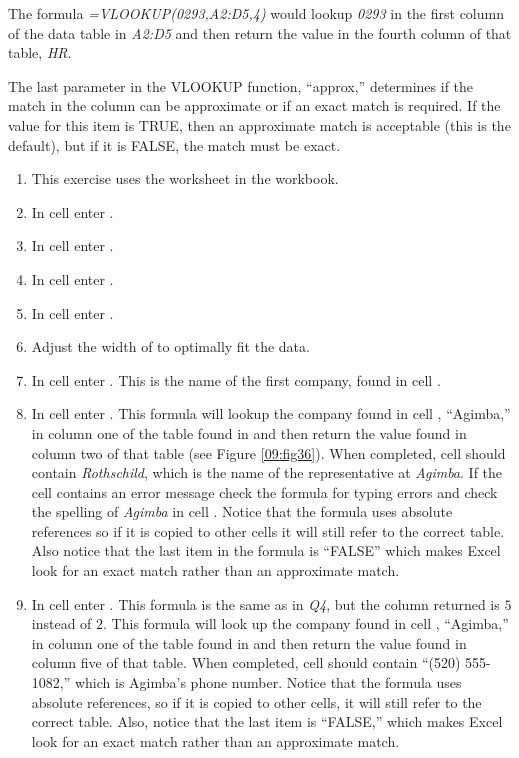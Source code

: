 The formula \textit{=VLOOKUP(0293,A2:D5,4)} would lookup \textit{0293} in the first column of the data table in \textit{A2:D5} and then return the value in the fourth column of that table, \textit{HR}.

The last parameter in the VLOOKUP function, ``approx,'' determines if the match in the column can be approximate or if an exact match is required. If the value for this item is TRUE, then an approximate match is acceptable (this is the default), but if it is FALSE, the match must be exact. 

\begin{enumbox}
	\begin{enumerate}
		\item This exercise uses the  worksheet in the  workbook.
		\item In cell  enter .
		\item In cell  enter .
		\item In cell  enter .
		\item In cell  enter .
		\item Adjust the width of  to optimally fit the data.
		\item In cell  enter . This is the name of the first company, found in cell .

		\item In cell  enter . This formula will lookup the company found in cell , ``Agimba,'' in column one of the table found in  and then return the value found in column two of that table (see Figure \ref{09:fig36}). When completed, cell  should contain \textit{Rothschild}, which is the name of the representative at \textit{Agimba}. If the cell contains an error message check the formula for typing errors and check the spelling of \textit{Agimba} in cell . Notice that the formula uses absolute references so if it is copied to other cells it will still refer to the correct table. Also notice that the last item in the formula is ``FALSE'' which makes Excel look for an exact match rather than an approximate match.

		\item In cell  enter . This formula is the same as in \textit{Q4}, but the column returned is $ 5 $ instead of $ 2 $. This formula will look up the company found in cell , ``Agimba,'' in column one of the table found in  and then return the value found in column five of that table. When completed, cell  should contain ``(520) 555-1082,'' which is Agimba's phone number.  Notice that the formula uses absolute references, so if it is copied to other cells, it will still refer to the correct table. Also, notice that the last item is ``FALSE,'' which makes Excel look for an exact match rather than an approximate match.


\end{enumerate}
\end{enumbox}
